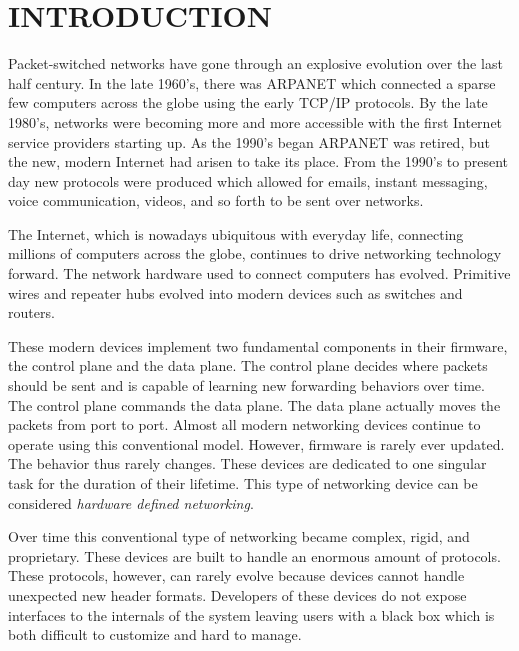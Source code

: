 \chapter{INTRODUCTION} \label{ch:intro}

%
%




Packet-switched networks have gone through an explosive evolution over the last half century. In the late 1960's, there was ARPANET which connected a sparse few computers across the globe using the early TCP/IP protocols. By the late 1980's, networks were becoming more and more accessible with the first Internet service providers starting up. As the 1990's began ARPANET was retired, but the new, modern Internet had arisen to take its place. From the 1990's to present day new protocols were produced which allowed for emails, instant messaging, voice communication, videos, and so forth to be sent over networks. 

The Internet, which is nowadays ubiquitous with everyday life, connecting millions of computers across the globe, continues to drive networking technology forward. The network hardware used to connect computers has evolved. Primitive wires and repeater hubs evolved into modern devices such as switches and routers.

These modern devices implement two fundamental components in their firmware, the control plane and the data plane. The control plane decides where packets should be sent and is capable of learning new forwarding behaviors over time. The control plane commands the data plane. The data plane actually moves the packets from port to port. Almost all modern networking devices continue to operate using this conventional model. However, firmware is rarely ever updated. The behavior thus rarely changes. These devices are dedicated to one singular task for the duration of their lifetime. This type of networking device can be considered \emph{hardware defined networking}.

Over time this conventional type of networking became complex, rigid, and proprietary. These devices are built to handle an enormous amount of protocols. These protocols, however, can rarely evolve because devices cannot handle unexpected new header formats. Developers of these devices do not expose interfaces to the internals of the system leaving users with a black box which is both difficult to customize and hard to manage.

